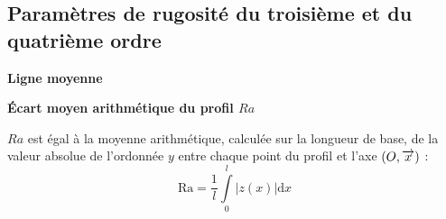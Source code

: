 \documentclass[10pt]{article}
\newif\ifprof
\begin{document}
\subsection{Paramètres de rugosité du troisième et du quatrième ordre}
\begin{defi}
\textbf{Ligne moyenne}

\end{defi}

\begin{defi}
\textbf{Écart moyen arithmétique du profil $Ra$}

$Ra$ est égal à la moyenne arithmétique, calculée sur la longueur de base, de la valeur absolue de l'ordonnée $y$ entre chaque point du profil et l'axe $\left(O,\overrightarrow{x}\right)$ :
$$ \text{Ra} = \dfrac{1}{l}\int \limits_0^l \left| z(x)\right| \mathrm{d}x $$

\end{defi}

\ifprof
\newpage

\setcounter{section}{0}
\begin{center}
\textsc\textbf{{Éléments de corrigé}}
\end{center}

\section{Mise en équation du problème}


\else
\fi
\end{document}
